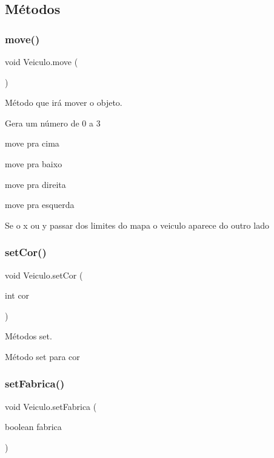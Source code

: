 \subsection{Métodos}
\mbox{\label{class_veiculo_a3341b0ed6b4d34db990a31f7a499ae80}} 
\subsubsection{\texorpdfstring{move()}{move()}}
{\footnotesize\ttfamily void Veiculo.\+move (\begin{DoxyParamCaption}{ }\end{DoxyParamCaption})}



Método que irá mover o objeto. 

Gera um número de 0 a 3

move pra cima

move pra baixo

move pra direita

move pra esquerda

Se o x ou y passar dos limites do mapa o veiculo aparece do outro lado \mbox{\label{class_veiculo_ab7fc7e6551ab238df0fb51a1a5c7d66f}} 
\subsubsection{\texorpdfstring{set\+Cor()}{setCor()}}
{\footnotesize\ttfamily void Veiculo.\+set\+Cor (\begin{DoxyParamCaption}\item[{int}]{cor }\end{DoxyParamCaption})}



Métodos set. 

Método set para cor \mbox{\label{class_veiculo_ae9a07a54a5824a9e8cace2c742034956}} 
\subsubsection{\texorpdfstring{set\+Fabrica()}{setFabrica()}}
{\footnotesize\ttfamily void Veiculo.\+set\+Fabrica (\begin{DoxyParamCaption}\item[{boolean}]{fabrica }\end{DoxyParamCaption})}

